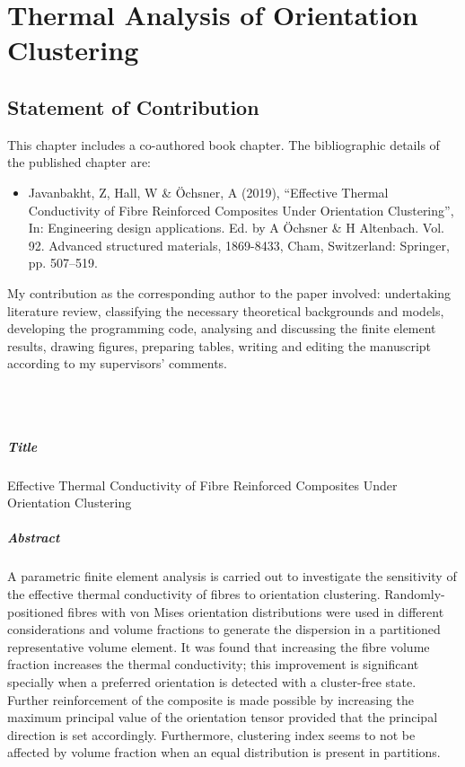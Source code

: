 \chapter{Thermal Analysis of Orientation Clustering}\label{chap:p5}
\section*{Statement of Contribution}
	This chapter includes a co-authored book chapter. The bibliographic details of the published chapter are:
\begin{itemize}
	\item Javanbakht, Z, Hall, W \& Öchsner, A (2019), “Effective Thermal Conductivity of Fibre Reinforced Composites Under Orientation Clustering”, In: Engineering design applications. Ed. by A Öchsner \& H Altenbach. Vol. 92. Advanced structured materials, 1869-8433, Cham, Switzerland: Springer, pp. 507–519.
\end{itemize}
	My contribution as the corresponding author to the paper involved: undertaking literature review, classifying the necessary theoretical backgrounds and models, developing the programming code, analysing and discussing the finite element results, drawing figures, preparing tables, writing and editing the manuscript according to my supervisors’ comments.

\Zia\\
\Wayne\\
\vfill
\newpage

\paragraph{Title} Effective Thermal Conductivity of Fibre Reinforced Composites Under Orientation Clustering

\paragraph{Abstract} A parametric finite element analysis is carried out to investigate the sensitivity of the effective thermal conductivity of fibres to orientation clustering. Randomly-positioned fibres with von Mises orientation distributions were used in different considerations and volume fractions to generate the dispersion in a partitioned representative volume element. It was found that increasing the fibre volume fraction increases the thermal conductivity; this improvement is significant specially when a preferred orientation is detected with a cluster-free state. Further reinforcement of the composite is made possible by increasing the maximum principal value of the orientation tensor provided that the principal direction is set accordingly. Furthermore, clustering index seems to not be affected by volume fraction when an equal distribution is present in partitions.

